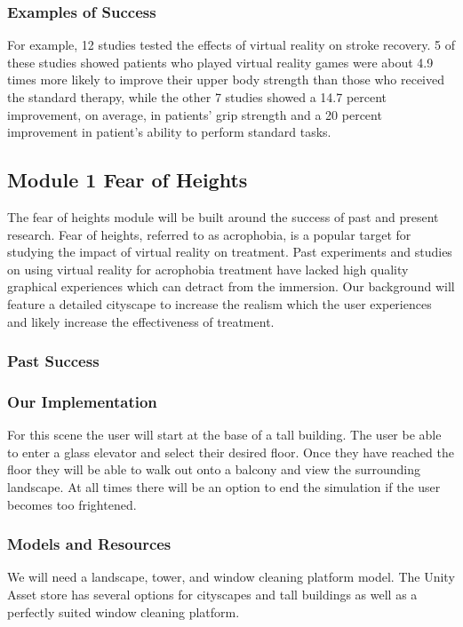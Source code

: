 \documentclass[a4paper,10pt]{article}
\begin{document}
\subsubsection{Examples of Success}
For example, 12 studies tested the effects of virtual reality on stroke recovery. 5 of these studies showed patients who played virtual reality games were about 4.9 times more likely to improve their upper body strength than those who received the standard therapy, while the other 7  studies showed a 14.7 percent improvement, on average, in patients' grip strength and a 20 percent improvement in patient's ability to perform standard tasks.\cite{stroke1}

\pagebreak
\subsection{Module 1 Fear of Heights}
The fear of heights module will be built around the success of past and present research. Fear of heights, referred to as acrophobia, is a popular target for studying the impact of virtual reality on treatment. Past experiments and studies on using virtual reality for acrophobia treatment have lacked high quality graphical experiences which can detract from the immersion. Our background will feature a detailed cityscape to increase the realism which the user experiences and likely increase the effectiveness of treatment.

\subsubsection{Past Success}


\subsubsection{Our Implementation}
For this scene the user will start at the base of a tall building. The user be able to enter a glass elevator and select their desired floor. Once they have reached the floor they will be able to walk out onto a balcony and view the surrounding landscape. At all times there will be an option to end the simulation if the user becomes too frightened.

\subsubsection{Models and Resources}
We will need a landscape, tower, and window cleaning platform model. The Unity Asset store has several options for cityscapes and tall buildings as well as a perfectly suited window cleaning platform.
\end{document}
